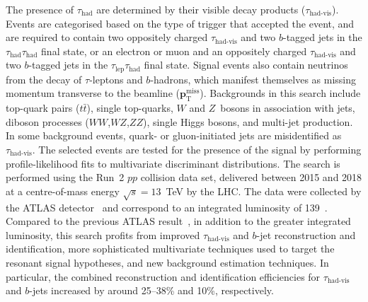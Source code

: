 \documentclass[twoside,11pt]{report}
\begin{document}
The presence of $\tau_\text{had}$ are determined by their visible decay products ($\tau_\text{had-vis}$). 
Events are categorised based on the type of trigger that accepted the event, 
and are required to contain two oppositely charged $\tau_\text{had-vis}$ 
and two $b$-tagged jets in the $\tau_\text{had}\tau_\text{had}$ final state, 
or an electron or muon and an oppositely charged $\tau_\text{had-vis}$ and 
two $b$-tagged jets in the $\tau_\text{lep}\tau_\text{had}$ final state. 
Signal events also contain neutrinos from the decay of $\tau$-leptons and $b$-hadrons, 
which manifest themselves as missing momentum transverse to the beamline ($\mathbf{p}_\text{T}^\text{miss}$). 
Backgrounds in this search include top-quark pairs ($t\bar t$), single top-quarks, 
$W$ and $Z$~bosons in association with jets, diboson processes ($WW$,$WZ$,$ZZ$), 
single Higgs bosons, and multi-jet production. 
In some background events, quark- or gluon-initiated jets are misidentified as $\tau_\text{had-vis}$. 
The selected events are tested for the presence of the signal 
by performing profile-likelihood fits to multivariate discriminant distributions. 
The search is performed using the Run~2 $pp$ collision data set,
delivered between 2015 and 2018 at a centre-of-mass energy $\sqrt{s}=13$~TeV by the LHC. 
The data were collected by the ATLAS detector~\cite{PERF-2007-01} 
and correspond to an integrated luminosity of 139~\ifb. 
Compared to the previous ATLAS result~\cite{HIGG-2016-16-witherratum}, 
in addition to the greater integrated luminosity,
this search profits from improved $\tau_\text{had-vis}$ and $b$-jet 
reconstruction and identification, more sophisticated multivariate techniques 
used to target the resonant signal hypotheses, and new background estimation techniques.
In particular, the combined reconstruction and identification 
efficiencies for $\tau_\text{had-vis}$ and $b$-jets increased by 
around 25--38\% and 10\%, respectively.%
\end{document}
